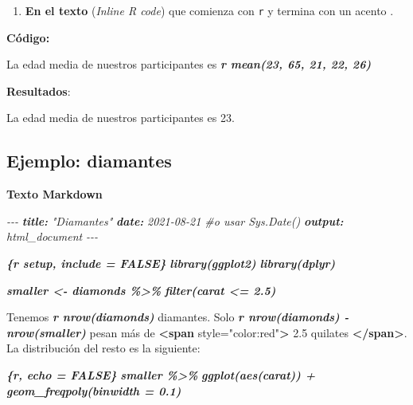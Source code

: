 \documentclass[
]{article}
\newenvironment{Shaded}{\begin{snugshade}}{\end{snugshade}}
\newcommand{\AnnotationTok}[1]{\textcolor[rgb]{0.56,0.35,0.01}{\textbf{\textit{#1}}}}
\newcommand{\CommentTok}[1]{\textcolor[rgb]{0.56,0.35,0.01}{\textit{#1}}}
\newcommand{\InformationTok}[1]{\textcolor[rgb]{0.56,0.35,0.01}{\textbf{\textit{#1}}}}
\newcommand{\KeywordTok}[1]{\textcolor[rgb]{0.13,0.29,0.53}{\textbf{#1}}}
\newcommand{\NormalTok}[1]{#1}
\newcommand{\OtherTok}[1]{\textcolor[rgb]{0.56,0.35,0.01}{#1}}
\newcommand{\StringTok}[1]{\textcolor[rgb]{0.31,0.60,0.02}{#1}}
\providecommand{\tightlist}{%
  \setlength{\itemsep}{0pt}\setlength{\parskip}{0pt}}
\begin{document}
\begin{enumerate}
\def\labelenumi{\arabic{enumi}.}
\setcounter{enumi}{1}
\tightlist
\item
  \textbf{En el texto} (\emph{Inline R code}) que comienza con
  \texttt{r} y termina con un acento
  \texttt{\textasciigrave{}\textasciigrave{}}.
\end{enumerate}

\textbf{Código: }

\begin{Shaded}
\begin{Highlighting}[]
\NormalTok{La edad media de nuestros participantes es }\InformationTok{\textasciigrave{}r mean(23, 65, 21, 22, 26)\textasciigrave{}}
\end{Highlighting}
\end{Shaded}

\textbf{Resultados}:

La edad media de nuestros participantes es 23.

\hypertarget{ejemplo-diamantes}{%
\subsection{Ejemplo: diamantes}\label{ejemplo-diamantes}}

\textbf{Texto Markdown}

\begin{Shaded}
\begin{Highlighting}[]
\CommentTok{{-}{-}{-}}
\AnnotationTok{title:}\CommentTok{ "Diamantes"}
\AnnotationTok{date:}\CommentTok{ 2021{-}08{-}21  \#o usar Sys.Date()}
\AnnotationTok{output:}\CommentTok{ html\_document}
\CommentTok{{-}{-}{-}}

\InformationTok{\textasciigrave{}\textasciigrave{}\textasciigrave{}\{r setup, include = FALSE\}}
\InformationTok{library(ggplot2)}
\InformationTok{library(dplyr)}

\InformationTok{smaller \textless{}{-} diamonds \%\textgreater{}\% }
\InformationTok{  filter(carat \textless{}= 2.5)}
\InformationTok{\textasciigrave{}\textasciigrave{}\textasciigrave{}}

\NormalTok{Tenemos }\InformationTok{\textasciigrave{}r nrow(diamonds)\textasciigrave{}}\NormalTok{ diamantes. Solo }
\InformationTok{\textasciigrave{}r nrow(diamonds) {-} nrow(smaller)\textasciigrave{}}\NormalTok{ pesan más de }
\KeywordTok{\textless{}span}\OtherTok{ style=}\StringTok{"color:red"}\KeywordTok{\textgreater{}}\NormalTok{ 2.5 quilates }\KeywordTok{\textless{}/span\textgreater{}}\NormalTok{. La distribución del resto es la siguiente:}

\InformationTok{\textasciigrave{}\textasciigrave{}\textasciigrave{}\{r, echo = FALSE\}}
\InformationTok{smaller \%\textgreater{}\% }
\InformationTok{  ggplot(aes(carat)) + }
\InformationTok{  geom\_freqpoly(binwidth = 0.1)}
\InformationTok{\textasciigrave{}\textasciigrave{}\textasciigrave{}}
 
\end{Highlighting}
\end{Shaded}
\end{document}
